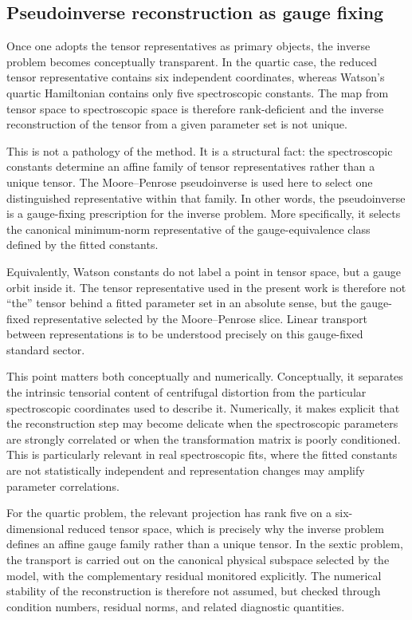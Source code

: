 \subsection{Pseudoinverse reconstruction as gauge fixing}

Once one adopts the tensor representatives as primary objects, the
inverse problem becomes conceptually transparent. In the quartic case,
the reduced tensor representative contains six independent
coordinates, whereas Watson's quartic Hamiltonian contains only five
spectroscopic constants. The map from tensor space to spectroscopic
space is therefore rank-deficient and the inverse reconstruction of
the tensor from a given parameter set is not unique.

This is not a pathology of the method. It is a structural fact: the
spectroscopic constants determine an affine family of tensor
representatives rather than a unique tensor. The Moore--Penrose
pseudoinverse is used here to select one distinguished representative
within that family. In other words, the pseudoinverse is a
gauge-fixing prescription for the inverse problem. More specifically,
it selects the canonical minimum-norm representative of the
gauge-equivalence class defined by the fitted constants.

Equivalently, Watson constants do not label a point in tensor space,
but a gauge orbit inside it. The tensor representative used in the
present work is therefore not ``the'' tensor behind a fitted parameter
set in an absolute sense, but the gauge-fixed representative selected
by the Moore--Penrose slice. Linear transport between representations
is to be understood precisely on this gauge-fixed standard sector.

This point matters both conceptually and numerically. Conceptually, it
separates the intrinsic tensorial content of centrifugal distortion
from the particular spectroscopic coordinates used to describe it.
Numerically, it makes explicit that the reconstruction step may become
delicate when the spectroscopic parameters are strongly correlated or
when the transformation matrix is poorly conditioned. This is
particularly relevant in real spectroscopic fits, where the fitted
constants are not statistically independent and representation changes
may amplify parameter correlations.

For the quartic problem, the relevant projection has rank five on a
six-dimensional reduced tensor space, which is precisely why the
inverse problem defines an affine gauge family rather than a unique
tensor. In the sextic problem, the transport is carried out on the
canonical physical subspace selected by the model, with the
complementary residual monitored explicitly. The numerical stability
of the reconstruction is therefore not assumed, but checked through
condition numbers, residual norms, and related diagnostic quantities.

